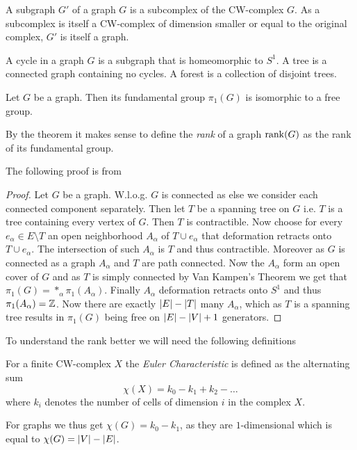 \begin{definition}
	A subgraph $G'$ of a graph $G$ is a subcomplex of the CW-complex $G$. As a subcomplex is itself a CW-complex of dimension smaller or equal to the original complex,
	 $G'$ is itself a graph.

	A cycle in a graph $G$ is a subgraph that is homeomorphic to $S^1$. A tree is a
	connected graph containing no cycles. A forest is a collection of disjoint trees.
\end{definition}

\begin{theorem}\label{thm:fg_graph}
	Let $G$ be a graph. Then its fundamental group $\pi_{1}(G)$ is isomorphic to a free group.
\end{theorem}
By the theorem it makes sense to define the \emph{rank} of a graph $\rank(G)$ as the rank of its fundamental group.

The following proof is from \cite[p. 43f]{hatcher00}
\begin{proof}
	Let $G$ be a graph. W.l.o.g. $G$ is connected as else we consider each connected component separately. 
	Then let $T$ be a spanning tree on $G$ i.e. $T$ is a tree containing every vertex of $G$.
	Then $T$ is contractible.
	Now choose for every $e_{\alpha} \in E \setminus T$ an open neighborhood $A_{\alpha}$ of $T \cup e_{\alpha}$ that deformation retracts onto $T \cup e_{\alpha}$.
	The intersection of such $A_{\alpha}$ is $T$ and thus contractible. Moreover as $G$ is connected as a graph $A_{\alpha}$ and $T$ are path connected.
	Now the $A_{\alpha}$ form an open cover of $G$ and as $T$ is simply connected by Van Kampen's Theorem we get that $\pi_{1}(G) = *_{\alpha} \pi_{1}(A_{\alpha})$.
	Finally $A_{\alpha}$ deformation retracts onto $S^{1}$ and thus $\pi_{1}(A_{\alpha}) = \mathbb{Z}$. Now there are exactly $\abs{E} - \abs{T}$ many $A_{\alpha}$,
	which as $T$ is a spanning tree results in $\pi_1(G)$ being free on $\abs{E} - \abs{V} + 1$ generators.
\end{proof}

To understand the rank better we will need the following definitions
\begin{definition}
	For a finite CW-complex $X$ the \emph{Euler Characteristic} is defined as the alternating sum
	\[
		\chi(X) = k_0 - k_1 + k_2 - \ldots
	\] 
	where $k_{i}$ denotes the number of cells of dimension $i$ in the complex $X$.
\end{definition}
For graphs we thus get $\chi (G) = k_0 - k_1$, as they are $1$-dimensional which is equal to $\chi(G) = \abs{V} - \abs{E}$.

